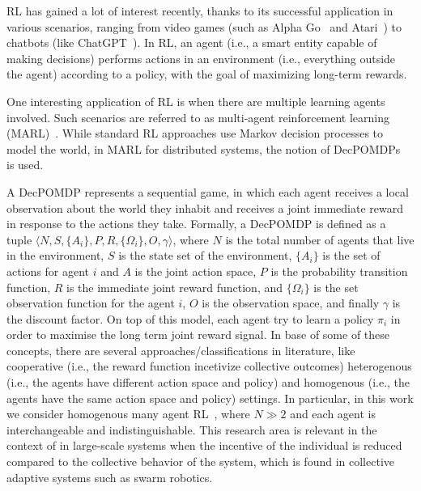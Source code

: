 \documentclass[conference]{IEEEtran}
\begin{document}
\Ac{RL} has gained a lot of interest recently, 
 thanks to its successful application in various scenarios, 
 ranging from video games (such as Alpha Go~\cite{Silver2016Go} and Atari~\cite{Atari2016DQN}) 
 to chatbots (like ChatGPT~\cite{ChatGPT2023}). 
% 
In \ac{RL}, an agent (i.e., a smart entity capable of making decisions) 
 performs actions in an environment (i.e., everything outside the agent) according to a policy, 
 with the goal of maximizing long-term rewards.

One interesting application of \ac{RL} is when there are multiple learning agents involved. 
 Such scenarios are referred to as multi-agent reinforcement learning (MARL)~\cite{zhang2019marl}. 
 While standard \ac{RL} approaches use Markov decision processes to model the world, 
 in MARL for distributed systems, the notion of 
 \acp{DecPOMDP}~\cite{Decpomdp2000} is used.

A \ac{DecPOMDP} represents a sequential game, 
 in which each agent receives a local observation about the world they 
 inhabit and receives a joint immediate reward in response to the actions they take. 
% 
Formally, a \ac{DecPOMDP} is defined as a tuple $\langle N, S, \{A_i\}, P, R, \{\Omega_i\}, O, \gamma \rangle$, 
 where $N$ is the total number of agents that live in the environment, 
 $S$ is the state set of the environment, 
 $\{A_i\}$ is the set of actions for agent $i$ and $A$ is the joint action space, 
 $P$ is the probability transition function, 
 $R$ is the immediate joint reward function, and 
 $\{\Omega_i\}$ is the set observation function for the agent $i$,
 $O$ is the observation space, and finally $\gamma$ is the discount factor.
%
On top of this model, each agent try to learn a policy $\pi_i$ in order 
 to maximise the long term joint reward signal.
In base of some of these concepts, 
 there are several approaches/classifications in literature, 
 like cooperative (i.e., the reward function incetivize collective outcomes)
 heterogenous (i.e., the agents have different action space and policy) and
 homogenous (i.e., the agents have the same action space and policy) settings.
%  
In particular, in this work we consider homogenous many agent RL~\cite{yang2021many}, 
 where $N \gg 2$ and each agent is interchangeable and indistinguishable.
%
This research area is relevant in the context of in large-scale systems 
 when the incentive of the individual is reduced compared to the collective behavior of the system, 
 which is found in collective adaptive systems such as swarm robotics.
\end{document}
